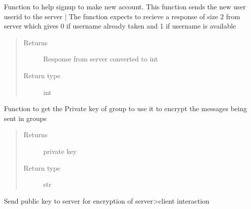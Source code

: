 \documentclass[letterpaper,10pt,english]{sphinxmanual}
\begin{document}
\begin{fulllineitems}
\begin{fulllineitems}
\label{\detokenize{Message:Message.Message._signupuid}}
Function to help signup to make new account. This function sends the new user userid to the server |
The function expects to recieve a response of size 2 from server which gives 0 if username already taken and 1 if username is available
\begin{quote}\begin{description}
\item[{Returns}] \leavevmode
Response from server converted to int

\item[{Return type}] \leavevmode
int

\end{description}\end{quote}

\end{fulllineitems}


\begin{fulllineitems}
\label{\detokenize{Message:Message.Message._create_group_key}}
Function to get the Private key of group to use it to encrypt the messages being sent in groups
\begin{quote}\begin{description}
\item[{Returns}] \leavevmode
private key

\item[{Return type}] \leavevmode
str

\end{description}\end{quote}

\end{fulllineitems}


\begin{fulllineitems}
\label{\detokenize{Message:Message.Message._keyex}}
Send public key to server for encryption of server\sphinxhyphen{}\textgreater{}client interaction


\end{fulllineitems}
\end{fulllineitems}
\end{document}
